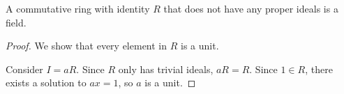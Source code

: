 \begin{proposition}
	A commutative ring with identity $R$ that does not have any proper ideals is a field. 
\end{proposition}
\begin{proof}
	We show that every element in $R$ is a unit. 
	
	Consider $I=aR$. Since $R$ only has trivial ideals, $aR=R$. Since $1\in R$, there exists a solution to $ax=1$, so $a$ is a unit. 
\end{proof}
